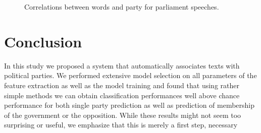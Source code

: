 \documentclass{article} %
\begin{document}
\begin{figure}
\begin{center}
%
\end{center}
\caption{
\label{fig:party_word_correlations}
Correlations between words and party for parliament speeches. }
\end{figure}

\section{Conclusion}
In this study we proposed a system that automatically associates texts with political parties. We performed extensive model selection on all parameters of the feature extraction as well as the model training and found that using rather simple methods we can obtain classification performances well above chance performance for both single party prediction as well as prediction of membership of the government or the opposition. While these results might not seem too surprising or useful, we emphasize that this is merely a first step, necessary 

\small{

 
}
\end{document}
